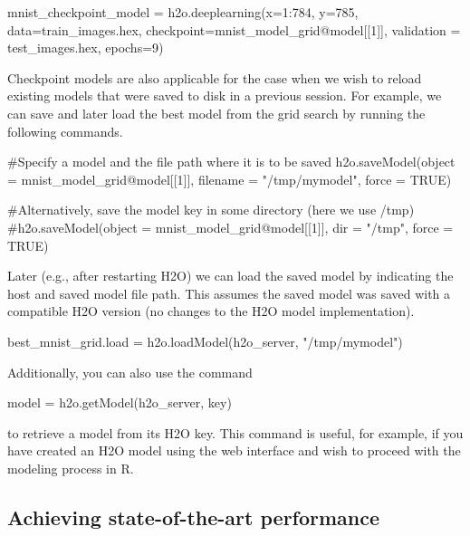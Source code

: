 \documentclass[11pt]{article}
\begin{document}
\begin{spverbatim}
mnist_checkpoint_model = h2o.deeplearning(x=1:784, y=785, data=train_images.hex, checkpoint=mnist_model_grid@model[[1]], validation = test_images.hex, epochs=9)

\end{spverbatim}
\noindent
Checkpoint models are also applicable for the case when we wish to reload existing models that were saved to disk in a previous session. For example, we can save and later load the best model from the grid search by running the following commands.

\begin{spverbatim}
#Specify a model and the file path where it is to be saved
h2o.saveModel(object = mnist_model_grid@model[[1]], filename = "/tmp/mymodel", force = TRUE)

#Alternatively, save the model key in some directory (here we use /tmp)
#h2o.saveModel(object = mnist_model_grid@model[[1]], dir = "/tmp", force = TRUE)

\end{spverbatim}
\noindent
Later (e.g., after restarting  H2O) we can load the saved model by indicating the host and saved model file path. This assumes the saved model was saved with a compatible H2O version (no changes to the H2O model implementation).

\begin{spverbatim}
best_mnist_grid.load = h2o.loadModel(h2o_server, "/tmp/mymodel")

\end{spverbatim}
\noindent
Additionally, you can also use the command
\begin{spverbatim}
model = h2o.getModel(h2o_server, key)

\end{spverbatim}
\noindent
to retrieve a model from its H2O key. This command is useful, for example, if you have created an H2O model using the web interface and wish to proceed with the modeling process in R.

\subsection{Achieving state-of-the-art performance} \label{3.6}
\end{document}
